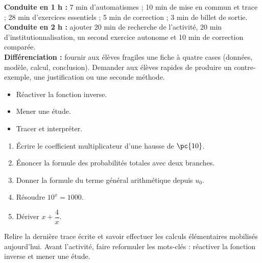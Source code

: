 \ifmxteacher
\begin{method}
\textbf{Conduite en 1 h :} 7 min d'automatismes ; 10 min de mise en commun et trace ; 28 min d'exercices essentiels ; 5 min de correction ; 3 min de billet de sortie.\\
\textbf{Conduite en 2 h :} ajouter 20 min de recherche de l'activité, 20 min d'institutionnalisation, un second exercice autonome et 10 min de correction comparée.\\
\textbf{Différenciation :} fournir aux élèves fragiles une fiche à quatre cases (données, modèle, calcul, conclusion). Demander aux élèves rapides de produire un contre-exemple, une justification ou une seconde méthode.
\end{method}
\fi
{}
\begin{objectives}\begin{itemize}\item Réactiver la fonction inverse.\item Mener une étude.\item Tracer et interpréter.\end{itemize}\end{objectives}
\begin{fluency}\begin{enumerate}\item Écrire le coefficient multiplicateur d'une hausse de $\pc{10}$. \item Énoncer la formule des probabilités totales avec deux branches. \item Donner la formule du terme général arithmétique depuis $u_0$. \item Résoudre $10^x=1000$. \item Dériver $x+\dfrac4x$. \end{enumerate}\end{fluency}
\begin{prerequisites}Relire la dernière trace écrite et savoir effectuer les calculs élémentaires mobilisés aujourd'hui. Avant l'activité, faire reformuler les mots-clés : réactiver la fonction inverse et mener une étude.\end{prerequisites}


